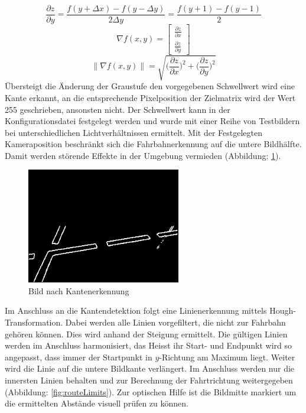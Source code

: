 \[
\frac{\partial{z}}{\partial{y}}=\frac{f(y+\Delta{x})-f(y-\Delta{y})}{2\Delta{y}} = \frac{f(y+1)-f(y-1)}{2}
\]
\[
\nabla f(x,y) = \begin{bmatrix}
\frac{\partial{z}}{\partial{x}}\\
\frac{\partial{z}}{\partial{y}}
\end{bmatrix}
\]
\[
\lVert\nabla f(x,y)\rVert = \sqrt{\Biggl(\frac{\partial{z}}{\partial{x}}\Biggr)^2 + \Biggl(\frac{\partial{z}}{\partial{y}}\Biggr)^2}
\]
Übersteigt die Änderung der Graustufe den vorgegebenen Schwellwert wird eine Kante erkannt, an die entsprechende Pixelposition der Zielmatrix wird der Wert 255 geschrieben, ansonsten nicht. Der Schwellwert kann in der Konfigurationsdatei festgelegt werden und wurde mit einer Reihe von Testbildern bei unterschiedlichen Lichtverhältnissen ermittelt. Mit der Festgelegten Kameraposition beschränkt sich die Fahrbahnerkennung auf die untere Bildhälfte. Damit werden störende Effekte in der Umgebung vermieden (Abbildung: \ref{fig:edges}). 
\begin{figure}[H]%
\centering
\includegraphics[width=0.6\textwidth]{03_Loesungskonzept/pictures/Kantengrafik.png}
\caption{Bild nach Kantenerkennung}
\label{fig:edges}
\end{figure}
Im Anschluss an die Kantendetektion folgt eine Linienerkennung mittels Hough-Transformation. Dabei werden alle Linien vorgefiltert, die nicht zur Fahrbahn gehören können. Dies wird anhand der Steigung ermittelt. Die gültigen Linien werden im Anschluss harmonisiert, das Heisst ihr Start- und Endpunkt wird so angepasst, dass 
immer der Startpunkt in $y$-Richtung am Maximum liegt. Weiter wird die Linie auf die untere Bildkante verlängert. Im Anschluss werden nur die innersten Linien behalten und zur Berechnung der Fahrtrichtung weitergegeben (Abbildung: \ref{fig:routeLimits}). Zur optischen Hilfe ist die Bildmitte markiert um die ermittelten Abstände visuell prüfen zu können.
